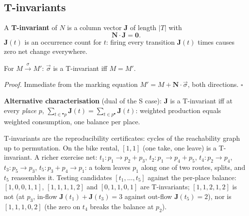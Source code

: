 \subsection{T-invariants}

\begin{definition}[T-invariant]
A \textbf{T-invariant} of $N$ is a column vector $\mathbf{J}$ of length $|T|$ with
\[
  \mathbf{N} \cdot \mathbf{J} = \mathbf{0}.
\]
$\mathbf{J}(t)$ is an occurrence count for $t$: firing every transition $\mathbf{J}(t)$ times causes zero net change everywhere.
\end{definition}

\begin{proposition}
For $M \xrightarrow{\sigma} M'$: $\vec{\sigma}$ is a T-invariant iff $M = M'$.
\end{proposition}

\textit{Proof.} Immediate from the marking equation $M' = M + \mathbf{N} \cdot \vec{\sigma}$, both directions. \hfill$\square$

\textbf{Alternative characterisation} (dual of the S case): $\mathbf{J}$ is a T-invariant iff at every \emph{place} $p$, $\sum_{t \in {}^\bullet p} \mathbf{J}(t) = \sum_{t \in p^\bullet} \mathbf{J}(t)$: weighted production equals weighted consumption, one balance per place.

T-invariants are the reproducibility certificates: cycles of the reachability graph up to permutation. On the bike rental, $[1,1]$ (one \textsf{take}, one \textsf{leave}) is a T-invariant. A richer exercise net: $t_1 : p_1 \to p_2 + p_3$, $t_2 : p_1 \to p_4 + p_5$, $t_4 : p_2 \to p_4$, $t_3 : p_5 \to p_3$, $t_5 : p_3 + p_4 \to p_1$: a token leaves $p_1$ along one of two routes, splits, and $t_5$ reassembles it. Testing candidates $[t_1, \ldots, t_5]$ against the per-place balance: $[1,0,0,1,1]$, $[1,1,1,1,2]$ and $[0,1,1,0,1]$ are T-invariants; $[1,1,2,1,2]$ is not (at $p_3$, in-flow $\mathbf{J}(t_1) + \mathbf{J}(t_3) = 3$ against out-flow $\mathbf{J}(t_5) = 2$), nor is $[1,1,1,0,2]$ (the zero on $t_4$ breaks the balance at $p_2$).

